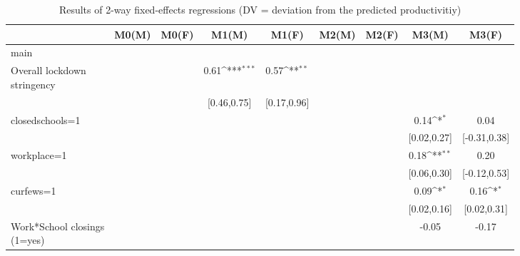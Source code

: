 \begin{table}[htbp]\centering
\def\sym#1{\ifmmode^{#1}\else\(^{#1}\)\fi}
\caption{Results of 2-way fixed-effects regressions (DV = deviation from the predicted productivitiy)}
\setlength\tabcolsep{0cm}
\begin{tabular}{l*{8}{c}}
\hline\hline
                    &\multicolumn{1}{c}{M0(M)}&\multicolumn{1}{c}{M0(F)}&\multicolumn{1}{c}{M1(M)}&\multicolumn{1}{c}{M1(F)}&\multicolumn{1}{c}{M2(M)}&\multicolumn{1}{c}{M2(F)}&\multicolumn{1}{c}{M3(M)}&\multicolumn{1}{c}{M3(F)}\\
\hline
main                &               &               &               &               &               &               &               &               \\
\specialcell{Overall lockdown\\ stringency}&               &               &  0.61\sym{***}&  0.57\sym{**} &               &               &               &               \\
                    &               &               &[0.46,0.75]         &[0.17,0.96]         &               &               &               &               \\
[1em]
closedschools=1     &               &               &               &               &               &               &  0.14\sym{*}  &  0.04         \\
                    &               &               &               &               &               &               &[0.02,0.27]         &[-0.31,0.38]         \\
[1em]
workplace=1         &               &               &               &               &               &               &  0.18\sym{**} &  0.20         \\
                    &               &               &               &               &               &               &[0.06,0.30]         &[-0.12,0.53]         \\
[1em]
curfews=1           &               &               &               &               &               &               &  0.09\sym{*}  &  0.16\sym{*}  \\
                    &               &               &               &               &               &               &[0.02,0.16]         &[0.02,0.31]         \\
[1em]
\specialcell{Work*School closings\\ (1=yes)}&               &               &               &               &               &               & -0.05         & -0.17         \\

\end{tabular}
\end{table}
